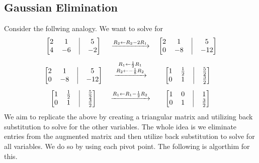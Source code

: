 \documentclass[11pt]{article}
\theoremstyle{definition}
\begin{document}
\subsection{Gaussian Elimination}
Consider the follwing analogy. We want to solve for 
\[
\arraycolsep=6pt
\begin{array}{cccccc}
\begin{bmatrix}
2 & 1 & \vrule & 5 \\
4 & -6 & \vrule & -2
\end{bmatrix}
& \xrightarrow{R_2 \leftarrow R_2 - 2R_1} &
\begin{bmatrix}
2 & 1 & \vrule & 5 \\
0 & -8 & \vrule & -12
\end{bmatrix}
\\[1.5em]
\begin{bmatrix}
2 & 1 & \vrule & 5 \\
0 & -8 & \vrule & -12
\end{bmatrix}
& \xrightarrow{\substack{R_1 \leftarrow \frac{1}{2}R_1 \\ R_2 \leftarrow -\frac{1}{8}R_2}} &
\begin{bmatrix}
1 & \frac{1}{2} & \vrule & \frac{5}{2} \\
0 & 1 & \vrule & \frac{3}{2}
\end{bmatrix}
\\[1.5em]
\begin{bmatrix}
1 & \frac{1}{2} & \vrule & \frac{5}{2} \\
0 & 1 & \vrule & \frac{3}{2}
\end{bmatrix}
& \xrightarrow{R_1 \leftarrow R_1 - \frac{1}{2}R_2} &
\begin{bmatrix}
1 & 0 & \vrule & 1 \\
0 & 1 & \vrule & \frac{3}{2}
\end{bmatrix}
\end{array}
\]
We aim to replicate the above by creating a triangular matrix and utilizing back substitution to solve for the other variables. The whole idea is we eliminate entries from the augmented matrix and then utilize back substitution to solve for all variables. We do so by using each pivot point. The following is algorthim for this. 
\end{document}
